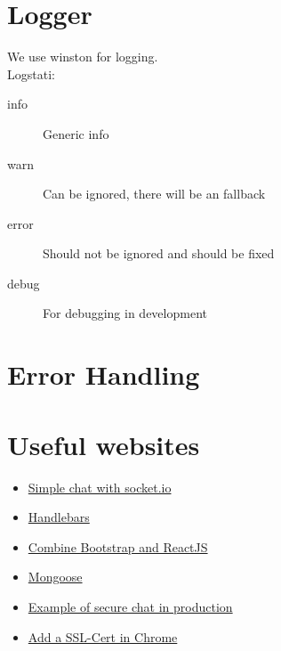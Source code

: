 \documentclass[10pt,a4paper,landscape]{article}
\begin{document}
\section{Logger}
    We use winston for logging.\\
    Logstati:\\
    \begin{description}
            \item[info]
                    Generic info\\
            \item[warn]
                    Can be ignored, there will be an fallback\\
            \item[error]
                    Should not be ignored and should be fixed\\
            \item[debug]
                    For debugging in development\\
    \end{description}
\section{Error Handling}
\section{Useful websites}
\begin{itemize}
        \item
            \href{https://socket.io/get-started/chat/}{Simple chat with socket.io}
        \item
            \href{www.handlebars.com}{Handlebars}
        \item 
            \href{https://www.packtpub.com/books/content/getting-started-react-and-bootstrap}{Combine Bootstrap and ReactJS}
        \item
            \href{http://mongoosejs.com/docs/guide.html}{Mongoose}
        \item
            \href{https://github.com/phutchins/pipo}{Example of secure chat in production}
        \item
            \href{https://support.securly.com/hc/en-us/articles/206081828-How-to-manually-install-the-Securly-SSL-certificate-in-Chrome}{Add a SSL-Cert in Chrome}
\end{itemize}
\end{document}
